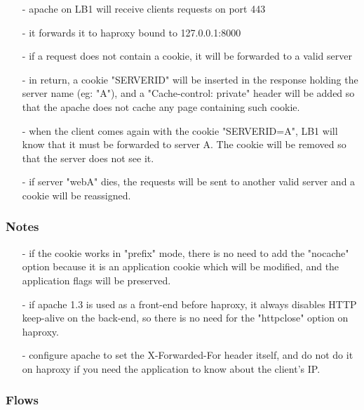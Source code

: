 \begin{itemize}
\item[-] apache on LB1 will receive clients requests on port 443
\item[-] it forwards it to haproxy bound to 127.0.0.1:8000
\item[-] if a request does not contain a cookie, it will be forwarded to a valid
   server
\item[-] in return, a cookie "SERVERID" will be inserted in the response holding the
   server name (eg: "A"), and a "Cache-control: private" header will be added
   so that the apache does not cache any page containing such cookie.
\item[-] when the client comes again with the cookie "SERVERID=A", LB1 will know that
   it must be forwarded to server A. The cookie will be removed so that the
   server does not see it.
\item[-] if server "webA" dies, the requests will be sent to another valid server
   and a cookie will be reassigned.
\end{itemize}

\subsubsection{Notes}

\begin{itemize}
\item[-] if the cookie works in "prefix" mode, there is no need to add the "nocache"
   option because it is an application cookie which will be modified, and the
   application flags will be preserved.
\item[-] if apache 1.3 is used as a front-end before haproxy, it always disables
   HTTP keep-alive on the back-end, so there is no need for the "httpclose"
   option on haproxy.
\item[-] configure apache to set the X-Forwarded-For header itself, and do not do
   it on haproxy if you need the application to know about the client's IP.
\end{itemize}

\newpage
\subsubsection{Flows}


